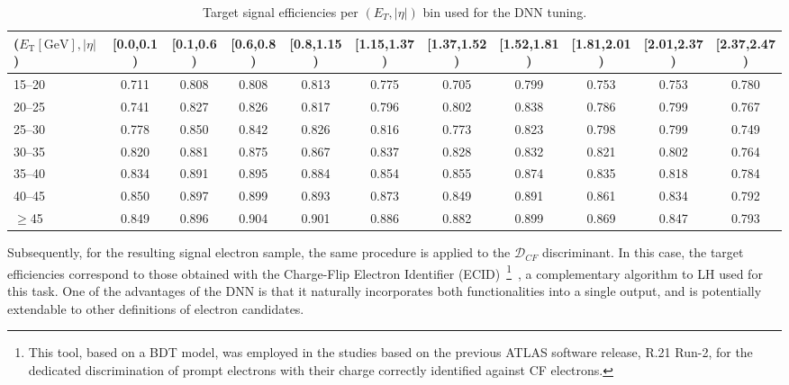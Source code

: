 \begin{table}[htbp]
  \centering
  \caption{Target signal efficiencies per $(E_T, |\eta|)$ bin used for the DNN tuning.}
  \renewcommand{\arraystretch}{1.2}
  \setlength{\tabcolsep}{0.8pt}
  \scriptsize
  \begin{tabular}{lcccccccccc}
  \toprule
  ($E_{\text{T}}[\text{GeV}],|\eta|$) 
  & \tiny{[0.0,0.1)} & \tiny{[0.1,0.6)} & \tiny{[0.6,0.8)} & \tiny{[0.8,1.15)} & \tiny{[1.15,1.37)} & \tiny{[1.37,1.52)} & \tiny{[1.52,1.81)} & \tiny{[1.81,2.01)} & \tiny{[2.01,2.37)} & \tiny{[2.37,2.47)} \\
  \midrule
  \tiny{15--20}  & 0.711 & 0.808 & 0.808 & 0.813 & 0.775 & 0.705 & 0.799 & 0.753 & 0.753 & 0.780 \\
  \tiny{20--25}  & 0.741 & 0.827 & 0.826 & 0.817 & 0.796 & 0.802 & 0.838 & 0.786 & 0.799 & 0.767 \\
  \tiny{25--30}  & 0.778 & 0.850 & 0.842 & 0.826 & 0.816 & 0.773 & 0.823 & 0.798 & 0.799 & 0.749 \\
  \tiny{30--35}  & 0.820 & 0.881 & 0.875 & 0.867 & 0.837 & 0.828 & 0.832 & 0.821 & 0.802 & 0.764 \\
  \tiny{35--40}  & 0.834 & 0.891 & 0.895 & 0.884 & 0.854 & 0.855 & 0.874 & 0.835 & 0.818 & 0.784 \\
  \tiny{40--45}  & 0.850 & 0.897 & 0.899 & 0.893 & 0.873 & 0.849 & 0.891 & 0.861 & 0.834 & 0.792 \\
  \tiny{$\geq$45} & 0.849 & 0.896 & 0.904 & 0.901 & 0.886 & 0.882 & 0.899 & 0.869 & 0.847 & 0.793 \\
  \bottomrule
  \end{tabular}
  \label{tab:target_effs}
  \end{table}
  

Subsequently, for the resulting signal electron sample, the same procedure is applied to the $\mathcal{D}_{CF}$ discriminant. In this case, the target efficiencies correspond to those obtained with the Charge-Flip Electron Identifier (ECID)~\footnote{This tool, based on a BDT model, was employed in the studies based on the previous ATLAS software release, R.21 Run-2, for the dedicated discrimination of prompt electrons with their charge correctly identified against CF electrons.}~\cite{Aaboud:2657964}, a complementary algorithm to LH used for this task. One of the advantages of the DNN is that it naturally incorporates both functionalities into a single output, and is potentially extendable to other definitions of electron candidates.


